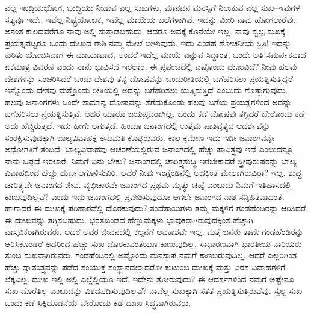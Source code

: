 ಎಲ್ಲ ಇಂದ್ರಿಯಭೋಗ, ಬುದ್ಧಿಯು ನೀಡುವ ಎಲ್ಲ ಸುಖಗಳು, ಮಾನವನ ಮನಸ್ಸಿಗೆ ನಿಲುಕುವ ಎಲ್ಲ ಸುಖ–ಇವುಗಳ ಸತ್ಯವೂ ಇದೇ. ಇವೆಲ್ಲ ನಿಷ್ಟ್ರಯೋಜಕ, ಇವೆಲ್ಲ ಮಾಯೆಯ ಬಲೆಗಳಾಗಿವೆ. ಇದನ್ನು ಮೀರಿ ನಾವು ಹೋಗಲಾರೆವು. ಅನಂತ ಕಾಲದವರೆಗೂ ನಾವು ಅಲ್ಲಿ ಸುತ್ತಾಡಬಹುದು, ಆದರೂ ಅವಕ್ಕೆ ಕೊನೆಯೇ ಇಲ್ಲ. ನಾವು ಸ್ವಲ್ಪ ಸುಖಕ್ಕೆ ಪ್ರಯತ್ನಪಟ್ಟರೂ ಒಂದು ದುಃಖದ ರಾಶಿ ನಮ್ಮ ಮೇಲೆ ಬೀಳುವುದು. ಇದು ಎಂತಹ ಶೋಚನೀಯ ಸ್ಥಿತಿ! ಇದನ್ನು ಕುರಿತು ಯೋಚಿಸಿದಾಗ ಈ ಮಾಯಾವಾದ, ಅಂದರೆ ಇದೆಲ್ಲ ಮಾಯೆ ಎನ್ನುವ ಸಿದ್ಧಾಂತ, ಒಂದೇ ಅತಿ ಸಮರ್ಪಕವಾದ ಏಕಮಾತ್ರ ವಿವರಣೆ ಎಂದು ನಾನು ಭಾವಿಸದೆ ಇರಲಾರ. ಈ ಪ್ರಪಂಚದಲ್ಲಿ ಎಷ್ಟೊಂದು ದುಃಖವಿದೆ? ನೀವು ಹಲವು ದೇಶಗಳನ್ನು ಸಂಚರಿಸಿದರೆ ಒಂದು ದೇಶವು ತನ್ನ ದೋಷವನ್ನು ಒಂದು\break ರೀತಿಯಲ್ಲಿ ಬಗೆಹರಿಸಲು ಪ್ರಯತ್ನಿಸುತ್ತಿದ್ದರೆ ಇನ್ನೊಂದು ದೇಶವು ಮತ್ತೊಂದು ರೀತಿಯಲ್ಲಿ ಅದನ್ನು ಬಗೆಹರಿಸಲು ಯತ್ನಿಸುತ್ತಿದೆ ಎಂಬುದು ಗೊತ್ತಾಗುವುದು. ಹಲವು ಜನಾಂಗಗಳು ಒಂದೇ ಸಾಮಾನ್ಯ ದೋಷವನ್ನು ತೆಗೆದುಕೊಂಡು ಹಲವು ಬಗೆಯ ಪ್ರಯತ್ನಗಳಿಂದ ಅದನ್ನು ಬಗೆಹರಿಸಲು ಪ್ರಯತ್ನಿಸುತ್ತಿವೆ. ಆದರೆ ಯಾರೂ ಜಯಪ್ರದರಾಗಿಲ್ಲ. ಒಂದು ಕಡೆ ದೋಷವು ತಗ್ಗಿದರೆ ಬೇರೊಂದು ಕಡೆ ಅದು ಹೆಚ್ಚಿರುತ್ತದೆ. ಇದು ಹೀಗೇ ಆಗುತ್ತದೆ. ಹಿಂದೂ ಜನಾಂಗದಲ್ಲಿ ಉತ್ತಮ ಪಾತಿವ್ರತ್ಯದ ಆದರ್ಶವನ್ನು ಸಂರಕ್ಷಿಸುವುದಕ್ಕಾಗಿ ಬಾಲ್ಯವಿವಾಹಕ್ಕೆ ಅನುಮತಿ ಕೊಟ್ಟಿರುವರು. ಕಾಲ ಕ್ರಮೇಣ ಇದು ಇಡೀ ಜನಾಂಗವನ್ನೇ ಅಧೋಗತಿಗೆ ತಂದಿದೆ. ಬಾಲ್ಯವಿವಾಹವು ಆಚರಣೆಯಲ್ಲಿರುವ ಜನಾಂಗದಲ್ಲಿ ಹೆಚ್ಚು ಪಾವಿತ್ರ್ಯವು ಇದೆ ಎಂಬುದನ್ನೂ ನಾನು ಒಪ್ಪದೆ ಇರಲಾರೆ. ನಿಮಗೆ ಏನು ಬೇಕು? ಜನಾಂಗದಲ್ಲಿ ಚಾರಿತ್ರ್ಯಶುದ್ಧಿ ಇರಬೇಕಾದರೆ ಸ್ತ್ರೀಪುರುಷರನ್ನು ಬಾಲ್ಯ ವಿವಾಹದಿಂದ ಹೆಚ್ಚು ದುರ್ಬಲಗೊಳಿಸುವಿರಿ. ಆದರೆ ನೀವು ಇಂಗ್ಲೆಂಡಿನಲ್ಲಿ ಅದಕ್ಕಿಂತ ಮೇಲಾಗಿರುವಿರಾ? ಇಲ್ಲ. ಶುದ್ಧ ಚಾರಿತ್ರ್ಯವೇ ಜನಾಂಗದ ಜೀವ. ವ್ಯಭಿಚಾರವೇ ಜನಾಂಗದ ಪ್ರಥಮ ಮೃತ್ಯು ಚಿಹ್ನೆ ಎಂಬುದು ನಿಮಗೆ ಇತಿಹಾಸದಲ್ಲಿ ಕಾಣುವುದಿಲ್ಲವೆ? ಎಂದು ಇದು ಜನಾಂಗದಲ್ಲಿ ಪ್ರವೇಶಿಸುವುದೋ ಆಗಲೇ ಜನಾಂಗದ ನಾಶ ಸನ್ನಿಹಿತವಾದಂತೆ. ಹಾಗಾದರೆ ಈ ದುಃಖಕ್ಕೆ ಪರಿಹಾರವೆಲ್ಲಿ ದೊರಕುವುದು? ತಂದೆತಾಯಿಗಳು ತಮ್ಮ ಮಕ್ಕಳಿಗೆ ಗಂಡಹೆಂಡಿರನ್ನು ಆರಿಸಿದರೆ ಈ ದುಃಖವನ್ನು ತಗ್ಗಿಸಬಹುದು. ಭರತಖಂಡದ ಹೆಣ್ಣುಮಕ್ಕಳು ಭಾವುಕರಾಗಿರುವುದಕ್ಕಿಂತ ಹೆಚ್ಚಾಗಿ ವಾಸ್ತವಿಕರಾಗಿರುವರು. ಆದರೆ ಅವರ ಜೀವನದಲ್ಲಿ ಕಲ್ಪನೆಗೆ ಅವಕಾಶವೇ ಇಲ್ಲ. ಮತ್ತೆ ಜನರು ತಾವೇ ಗಂಡಹೆಂಡಿರನ್ನು ಆರಿಸಿಕೊಂಡರೆ ಅದರಿಂದ ಹೆಚ್ಚು ಸುಖ ದೊರಕುವಂತೆಯೂ ಕಾಣುವುದಿಲ್ಲ. ಸಾಧಾರಣವಾಗಿ ಭಾರತೀಯ ನಾರಿಯರು ತುಂಬ ಸುಖವಾಗಿರುವರು. ಗಂಡಹೆಂಡಿರಲ್ಲಿ 	ಅಷ್ಟೊಂದು ಮನಸ್ತಾಪ ನಮಗೆ ಕಾಣಬರುವುದಿಲ್ಲ. ಆದರೆ ಎಲ್ಲರಿಗಿಂತ ಹೆಚ್ಚು ಸ್ವಾತಂತ್ರ್ಯವನ್ನು ಪಡೆದ ಸಂಯುಕ್ತ ಸಂಸ್ಥಾನದಲ್ಲಾದರೋ ಕುಟುಂಬ ದುಃಖಕ್ಕೆ ಮತ್ತು ವಿರಸ ವಿವಾಹಗಳಿಗೆ ಲೆಕ್ಕವಿಲ್ಲ. ದುಃಖ ಇಲ್ಲಿ ಅಲ್ಲಿ ಎಲ್ಲೆಲ್ಲಿಯೂ ಇದೆ. ಇದೇನು ತೋರುವುದು? ಈ ಆದರ್ಶಗಳಿಂದ ನಮಗೆ ಅಷ್ಟೇನೂ ಸುಖ ದೊರೆತಿಲ್ಲ ಎಂಬುದನ್ನು ವಿಶದಪಡಿಸುವುದಿಲ್ಲವೆ? ನಾವೆಲ್ಲ ಸುಖಕ್ಕಾಗಿ ಸತತ ಪ್ರಯತ್ನಿಸುತ್ತಿರುವೆವು. ಸ್ವಲ್ಪ ಸುಖ ಒಂದು ಕಡೆ ಸಿಕ್ಕಿದೊಡನೆಯೆ ಬೇರೊಂದು ಕಡೆ ದುಃಖ ಸಿದ್ಧವಾಗಿರುವರು.


